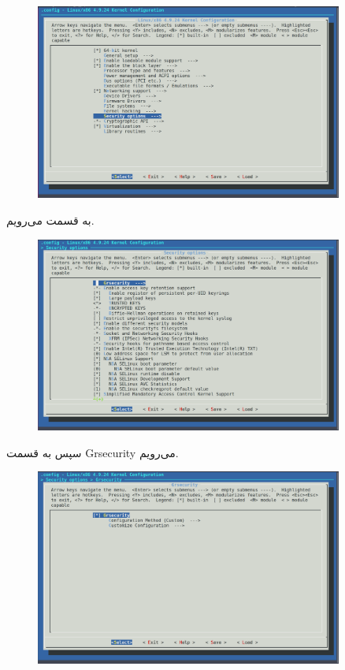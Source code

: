 \documentclass{article}
\begin{document}
\begin{enumerate}
\begin{figure}[ht]
	\centering	
	\includegraphics[width = 0.9\textwidth]{images/1.png}
\end{figure}
به قسمت  می‌رویم.
\begin{figure}[ht]
	\centering	
	\includegraphics[width = 0.9\textwidth]{images/2.png}
\end{figure}

سپس به قسمت Grsecurity می‌رویم.
\newpage
\begin{figure}[ht]
	\centering	
	\includegraphics[width = 0.9\textwidth]{images/3.png}
\end{figure}


\end{enumerate}
\end{document}
